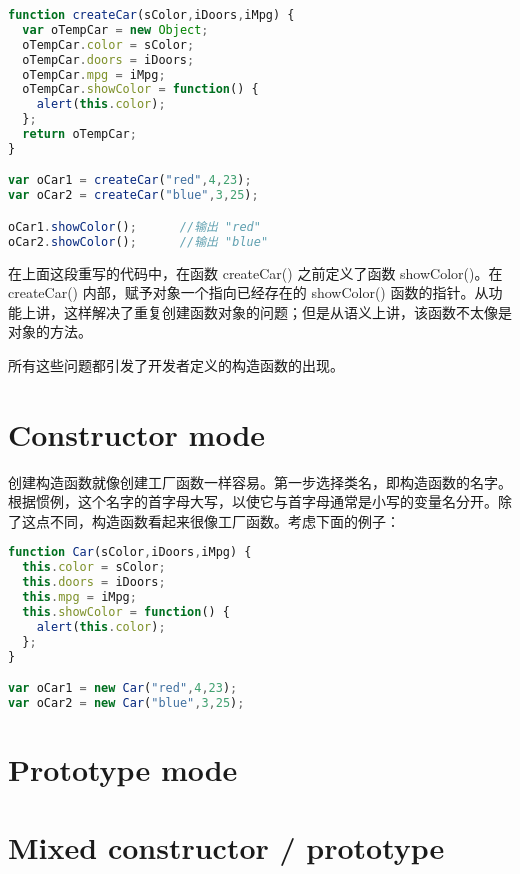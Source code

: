 \begin{lstlisting}[language=JavaScript]
function createCar(sColor,iDoors,iMpg) {
  var oTempCar = new Object;
  oTempCar.color = sColor;
  oTempCar.doors = iDoors;
  oTempCar.mpg = iMpg;
  oTempCar.showColor = function() {
    alert(this.color);
  };
  return oTempCar;
}

var oCar1 = createCar("red",4,23);
var oCar2 = createCar("blue",3,25);

oCar1.showColor();		//输出 "red"
oCar2.showColor();		//输出 "blue"
\end{lstlisting}


在上面这段重写的代码中，在函数 createCar() 之前定义了函数 showColor()。在 createCar() 内部，赋予对象一个指向已经存在的 showColor() 函数的指针。从功能上讲，这样解决了重复创建函数对象的问题；但是从语义上讲，该函数不太像是对象的方法。

所有这些问题都引发了开发者定义的构造函数的出现。




\section{Constructor mode}


创建构造函数就像创建工厂函数一样容易。第一步选择类名，即构造函数的名字。根据惯例，这个名字的首字母大写，以使它与首字母通常是小写的变量名分开。除了这点不同，构造函数看起来很像工厂函数。考虑下面的例子：


\begin{lstlisting}[language=JavaScript]
function Car(sColor,iDoors,iMpg) {
  this.color = sColor;
  this.doors = iDoors;
  this.mpg = iMpg;
  this.showColor = function() {
    alert(this.color);
  };
}

var oCar1 = new Car("red",4,23);
var oCar2 = new Car("blue",3,25);
\end{lstlisting}






\section{Prototype mode}








\section{Mixed constructor / prototype}






